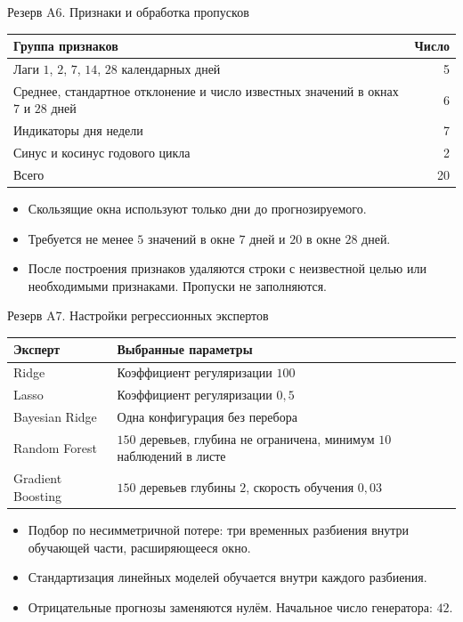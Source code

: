 \documentclass[11pt,aspectratio=169]{beamer}
\begin{document}
\begin{frame}{Резерв A6. Признаки и обработка пропусков}
  \begin{center}
    \begin{tabular}{@{}p{}r@{}}
      \toprule
      Группа признаков & Число\\
      \midrule
      Лаги $1$, $2$, $7$, $14$, $28$ календарных дней & 5\\
      Среднее, стандартное отклонение и число известных значений
        в окнах $7$ и $28$ дней & 6\\
      Индикаторы дня недели & 7\\
      Синус и косинус годового цикла & 2\\
      \midrule
      Всего & 20\\
      \bottomrule
    \end{tabular}
  \end{center}
  \begin{itemize}
    \item Скользящие окна используют только дни до прогнозируемого.
    \item Требуется не менее $5$ значений в окне $7$ дней и $20$ в окне $28$ дней.
    \item После построения признаков удаляются строки с неизвестной целью
          или необходимыми признаками. Пропуски не заполняются.
  \end{itemize}
\end{frame}

\begin{frame}{Резерв A7. Настройки регрессионных экспертов}
  \begin{center}
    \begin{tabular}{@{}lp{}@{}}
      \toprule
      Эксперт & Выбранные параметры\\
      \midrule
      Ridge & Коэффициент регуляризации $100$\\
      Lasso & Коэффициент регуляризации $0{,}5$\\
      Bayesian Ridge & Одна конфигурация без перебора\\
      Random Forest & $150$ деревьев, глубина не ограничена,
        минимум $10$ наблюдений в листе\\
      Gradient Boosting & $150$ деревьев глубины $2$,
        скорость обучения $0{,}03$\\
      \bottomrule
    \end{tabular}
  \end{center}
  \begin{itemize}
    \item Подбор по несимметричной потере: три временных разбиения
          внутри обучающей части, расширяющееся окно.
    \item Стандартизация линейных моделей обучается внутри каждого разбиения.
    \item Отрицательные прогнозы заменяются нулём. Начальное число генератора: $42$.
  \end{itemize}
\end{frame}
\end{document}
